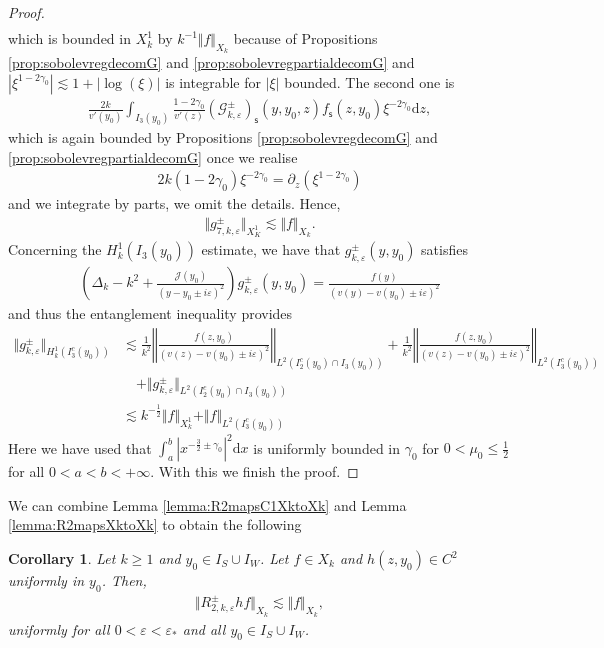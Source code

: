 \documentclass[11pt,reqno]{amsproc}
\newtheorem{corollary}[proposition]{Corollary}
\theoremstyle{definition}
\numberwithin{equation}{section}
\newcommand{\G}{{\mathcal{G}}}
\newcommand{\cJ}{{\mathcal{J}}}
\newcommand{\D}{{\Delta}}
\newcommand{\s}{{\mathsf{s}}}
\renewcommand{\d}{\mathrm{d}}
\newcommand{\ep}{\varepsilon}
\begin{document}
\begin{proof}
\begin{align*}
\end{align*}
which is bounded in $X_k^1$ by $k^{-1}\Vert f\Vert_{X_k}$ because of Propositions \ref{prop:sobolevregdecomG} and \ref{prop:sobolevregpartialdecomG} and $\left| \xi^{1-2\gamma_0} \right| \lesssim 1 + |\log(\xi) |$
is integrable for $|\xi|$ bounded. The second one is
\begin{align*}
\frac{2k}{v'(y_0)}\int_{I_3(y_0)}\frac{1-2\gamma_0}{v'(z)}  \left(\G_{k,\ep}^\pm \right)_\s (y,y_0,z) f_\s(z,y_0) \xi^{-2\gamma_0}\d z,
\end{align*}
which is again bounded by Propositions \ref{prop:sobolevregdecomG} and \ref{prop:sobolevregpartialdecomG} once we realise
\begin{align*}
2k(1-2\gamma_0)\xi^{-2\gamma_0} = \partial_z \left( \xi^{1-2\gamma_0} \right)
\end{align*}
and we integrate by parts, we omit the details. Hence,
\begin{align*}
\Vert g_{7,k,\ep}^\pm\Vert_{X_K^1}\lesssim \Vert f \Vert_{X_k}.
\end{align*} 
Concerning the $H_k^1(I_3(y_0))$ estimate,  we have that $g_{k,\ep}^\pm(y,y_0)$ satisfies
\begin{align*}
\left( \D_k - k^2 + \frac{\cJ(y_0)}{(y-y_0\pm i\ep)^2} \right) g_{k,\ep}^\pm(y,y_0) = \frac{f(y)}{(v(y)-v(y_0)\pm i\ep)^2}
\end{align*}
and thus the entanglement inequality provides
\begin{align*}
\Vert g_{k,\ep}^\pm \Vert_{H_k^1(I_3^c(y_0))} &\lesssim \frac{1}{k^2}\left \Vert \frac{f(z,y_0)}{(v(z)-v(y_0)\pm i\ep)^2}\right\Vert_{L^2(I_2^c(y_0)\cap I_3(y_0))} + \frac{1}{k^2}\left \Vert \frac{f(z,y_0)}{(v(z)-v(y_0)\pm i\ep)^2}\right\Vert_{L^2(I_3^c(y_0))} \\
&\quad+  \Vert g_{k,\ep}^\pm \Vert_{L^2(I_2^c(y_0)\cap I_3(y_0))} \\
&\lesssim  k^{-\frac12}\Vert f \Vert_{X_k^1} +  \Vert f \Vert_{L^2(I_3^c(y_0))} 
\end{align*}
Here we have used that $\int_a^b |x^{-\frac32\pm \gamma_0}|^2 \d x$ is uniformly bounded in $\gamma_0$ for $0<\mu_0 \leq \frac12$ for all $0 < a < b < +\infty$. With this we finish the proof.
\end{proof}

We can combine Lemma \ref{lemma:R2mapsC1XktoXk} and Lemma \ref{lemma:R2mapsXktoXk} to obtain the following

\begin{corollary}\label{cor:R2mapsCXktoXk}
Let $k\geq 1$ and $y_0\in I_S\cup I_W$. Let $f\in X_k$ and $h(z,y_0)\in C^2$ uniformly in $y_0$. Then,
\begin{align*}
\Vert R_{2,k,\ep}^\pm hf \Vert_{X_k}\lesssim \Vert f \Vert_{X_k},
\end{align*}
uniformly for all $0<\ep<\ep_*$ and all $y_0\in I_S\cup I_W$. 
\end{corollary}
\end{document}
